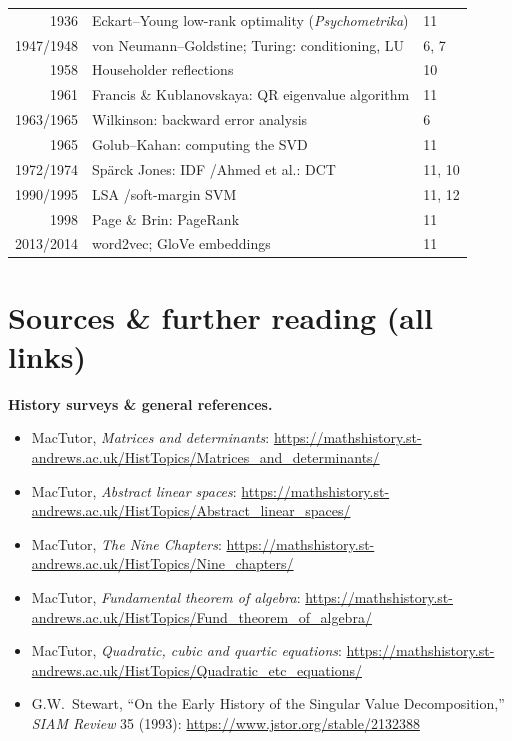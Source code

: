 \documentclass[11pt]{article}
\begin{document}
\begin{center}
\begin{tabular}{@{}r l l@{}}
1936 & Eckart--Young low-rank optimality (\emph{Psychometrika})             & 11 \\
1947/1948 & von Neumann--Goldstine; Turing: conditioning, LU                & 6, 7 \\
1958 & Householder reflections                                              & 10 \\
1961 & Francis \& Kublanovskaya: QR eigenvalue algorithm                    & 11 \\
1963/1965 & Wilkinson: backward error analysis                              & 6 \\
1965 & Golub--Kahan: computing the SVD                                      & 11 \\
1972/1974 & Sp\"arck Jones: IDF \quad/\quad Ahmed et al.: DCT               & 11, 10 \\
1990/1995 & LSA \quad/\quad soft-margin SVM                                 & 11, 12 \\
1998 & Page \& Brin: PageRank                                               & 11 \\
2013/2014 & word2vec; GloVe embeddings                                      & 11 \\
\bottomrule
\end{tabular}
\end{center}

\section*{Sources \& further reading (all links)}
\small
\textbf{History surveys \& general references.}
\begin{itemize}[leftmargin=1.4em,itemsep=1pt]
  \item MacTutor, \emph{Matrices and determinants}: \url{https://mathshistory.st-andrews.ac.uk/HistTopics/Matrices_and_determinants/}
  \item MacTutor, \emph{Abstract linear spaces}: \url{https://mathshistory.st-andrews.ac.uk/HistTopics/Abstract_linear_spaces/}
  \item MacTutor, \emph{The Nine Chapters}: \url{https://mathshistory.st-andrews.ac.uk/HistTopics/Nine_chapters/}
  \item MacTutor, \emph{Fundamental theorem of algebra}: \url{https://mathshistory.st-andrews.ac.uk/HistTopics/Fund_theorem_of_algebra/}
  \item MacTutor, \emph{Quadratic, cubic and quartic equations}: \url{https://mathshistory.st-andrews.ac.uk/HistTopics/Quadratic_etc_equations/}
  \item G.W.\ Stewart, ``On the Early History of the Singular Value Decomposition,'' \emph{SIAM Review} 35 (1993): \url{https://www.jstor.org/stable/2132388}
\end{itemize}
\end{document}
